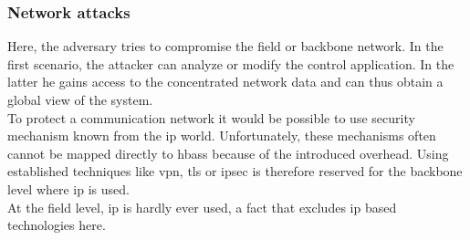 \subsubsection{Network attacks}
Here, the adversary tries to compromise the field or backbone network. In the first scenario, the attacker can analyze or modify the control application. In the latter he
gains access to the concentrated network data and can thus obtain a global view of the system.
\\
To protect a communication network it would be possible to use security mechanism known from the \gls{ip} world. 
Unfortunately, these mechanisms often cannot be mapped directly to \glspl{hbas} because of the introduced overhead. Using
established techniques like \gls{vpn}, \gls{tls} or \gls{ipsec} is therefore reserved for the backbone level where \gls{ip} is used.
\\
At the field level, \gls{ip} is hardly ever used, a fact that excludes \gls{ip} based technologies here.

